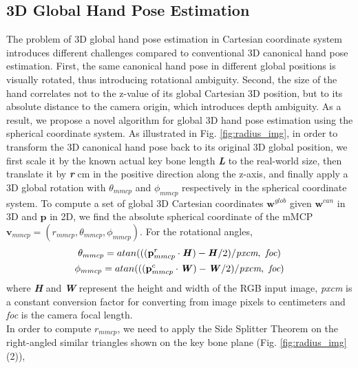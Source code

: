 \documentclass[10pt,twocolumn,letterpaper]{article}
\begin{document}
\subsection{3D Global Hand Pose Estimation}\label{sec:3D_glob}
\indent The problem of 3D global hand pose estimation in Cartesian coordinate system introduces different challenges compared to conventional 3D canonical hand pose estimation. First, the same canonical hand pose in different global positions is visually rotated, thus introducing rotational ambiguity. Second, the size of the hand correlates not to the z-value of its global Cartesian 3D position, but to its absolute distance to the camera origin, which introduces depth ambiguity. As a result, we propose a novel algorithm for global 3D hand pose estimation using the spherical coordinate system. As illustrated in Fig. \ref{fig:radius_img}, in order to transform the 3D canonical hand pose back to its original 3D global position, we first scale it by the known actual key bone length \textbf{\textit{L}} to the real-world size, then translate it by \textbf{\textit{r}} cm in the positive direction along the z-axis, and finally apply a 3D global rotation with $\theta_{mmcp}$ and $\phi_{mmcp}$ respectively in the spherical coordinate system.  To compute a set of global 3D Cartesian coordinates $\textbf{w}^{glob}$ given $\textbf{w}^{can}$ in 3D and $\textbf{p}$ in 2D, we find the absolute spherical coordinate of the mMCP $\textbf{v}_{mmcp} = (\textit{r}_{mmcp}, \theta_{mmcp}, \phi_{mmcp})$. For the rotational angles, \\
\begin{equation}\label{eq:spherical_angles}
\begin{gathered}
\theta_{mmcp} = atan(((\textbf{p}^{r}_{mmcp}\cdot\textbf{\textit{H}})-\textbf{\textit{H}}/2)/\textit{pxcm},\ \textit{foc})\\
\phi_{mmcp} = atan(((\textbf{p}^{c}_{mmcp}\cdot\textbf{\textit{W}})-\textbf{\textit{W}}/2)/\textit{pxcm},\ \textit{foc})\\
\end{gathered}
\end{equation}
where \textbf{\textit{H}} and \textbf{\textit{W}} represent the height and width of the RGB input image, \textit{pxcm} is a constant conversion factor for converting from image pixels to centimeters and \textit{foc} is the camera focal length.\\
\indent In order to compute $\textit{r}_{mmcp}$, we need to apply the Side Splitter Theorem on the right-angled similar triangles shown on the key bone plane (Fig. \ref{fig:radius_img} (2)), \\
\end{document}
